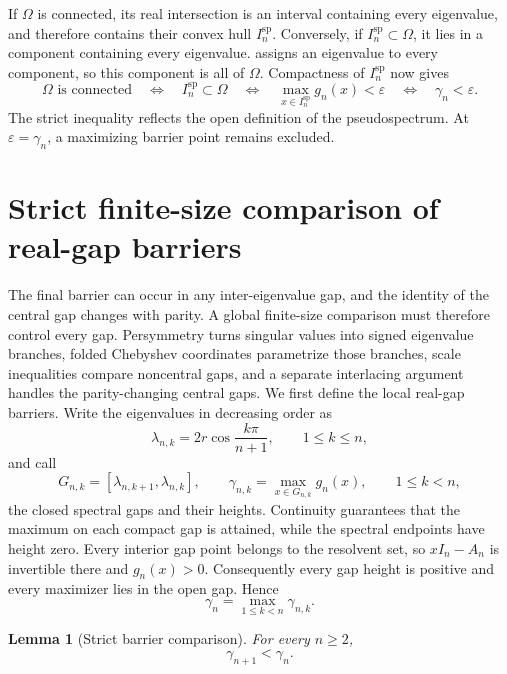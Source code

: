 \documentclass[a4paper,preprint,12pt,nopreprintline,sort&compress]{elsarticle}
\numberwithin{equation}{section}
\newtheorem{lemma}[theorem]{Lemma}
\theoremstyle{remark}
\begin{document}
If \(\Omega\) is connected, its real intersection is an interval
containing every eigenvalue, and therefore contains their convex hull
\(I_n^{\mathrm{sp}}\).  Conversely, if
\(I_n^{\mathrm{sp}}\subset\Omega\), it lies in a component containing every
eigenvalue.   assigns an eigenvalue to every component,
so this component is all of \(\Omega\).  Compactness of
\(I_n^{\mathrm{sp}}\) now gives
\begin{equation}\label{eq:connected-iff-gamma}
 \Omega\text{ is connected}
 \quad\Longleftrightarrow\quad
 I_n^{\mathrm{sp}}\subset\Omega
 \quad\Longleftrightarrow\quad
 \max_{x\in I_n^{\mathrm{sp}}}g_n(x)<\varepsilon
 \quad\Longleftrightarrow\quad
 \gamma_n<\varepsilon.
\end{equation}
The strict inequality reflects the open definition of the pseudospectrum.
At \(\varepsilon=\gamma_n\), a maximizing barrier point remains excluded.

\section{Strict finite-size comparison of real-gap barriers}
\label{sec:mesh}

The final barrier can occur in any inter-eigenvalue gap, and the identity of
the central gap changes with parity.  A global finite-size comparison must
therefore control every gap.  Persymmetry turns singular values into signed
eigenvalue branches, folded Chebyshev coordinates parametrize those
branches, scale inequalities compare noncentral gaps, and a separate
interlacing argument handles the parity-changing central gaps.  We first
define the local real-gap barriers.
Write the eigenvalues in decreasing order as
\[
 \lambda_{n,k}=2r\cos\frac{k\pi}{n+1},\qquad 1\leq k\leq n,
\]
and call
\[
 G_{n,k}=[\lambda_{n,k+1},\lambda_{n,k}],\qquad
 \gamma_{n,k}=\max_{x\in G_{n,k}}g_n(x),\qquad 1\leq k<n,
\]
the closed spectral gaps and their heights.  Continuity guarantees that the
maximum on each compact gap is attained, while the spectral endpoints have
height zero.  Every
interior gap point belongs to the resolvent set, so \(xI_n-A_n\) is invertible
there and \(g_n(x)>0\).  Consequently every gap height is positive and every
maximizer lies in the open gap.  Hence
\begin{equation}\label{eq:gamma-def}
 \gamma_n=\max_{1\leq k<n}\gamma_{n,k}.
\end{equation}

\begin{lemma}[Strict barrier comparison]\label{lem:mesh}
For every \(n\geq2\),
\[
 \gamma_{n+1}<\gamma_n.
\]
\end{lemma}
\end{document}
